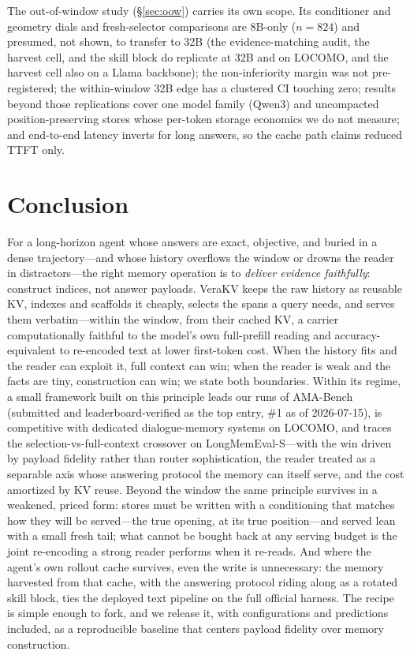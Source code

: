 \documentclass{article} %
\newcommand{\kvm}{VeraKV}
\begin{document}
The out-of-window study (\S\ref{sec:oow}) carries its own scope. Its conditioner and
geometry dials and fresh-selector comparisons are 8B-only ($n{=}824$) and presumed, not
shown, to transfer to 32B (the evidence-matching audit, the harvest cell, and the skill
block do replicate at 32B and on LOCOMO, and the harvest cell also on a Llama
backbone); the non-inferiority margin was
not pre-registered; the within-window 32B edge has a clustered CI touching zero; results
beyond those replications cover one model family (Qwen3) and uncompacted
position-preserving stores whose
per-token storage economics we do not measure; and end-to-end latency inverts for long
answers, so the cache path claims reduced TTFT only.

\section{Conclusion}
\label{sec:conclusion}

For a long-horizon agent whose answers are exact, objective, and buried in a
dense trajectory---and whose history overflows the window or drowns the reader
in distractors---the right memory operation is to \emph{deliver evidence
faithfully}: construct indices, not answer payloads. \kvm{} keeps the raw
history as reusable KV, indexes and scaffolds it cheaply, selects the spans a
query needs, and serves them verbatim---within the window, from their cached KV,
a carrier computationally faithful to the model's own full-prefill reading and
accuracy-equivalent to re-encoded text at lower first-token cost. When the
history fits and the reader can exploit
it, full context can win; when the reader is weak and the facts are tiny,
construction can win; we state both boundaries. Within its regime, a small
framework built on this principle leads our runs of AMA-Bench (submitted and
leaderboard-verified as the top entry, \#1 as of 2026-07-15), is competitive with dedicated
dialogue-memory systems on LOCOMO, and traces the selection-vs-full-context
crossover on LongMemEval-S---with the win driven by payload fidelity rather than
router sophistication, the reader treated as a separable axis whose answering
protocol the memory can itself serve, and the cost amortized by KV reuse.
Beyond the window the same principle survives in a weakened, priced form: stores must be
written with a conditioning that matches how they will be served---the true opening, at
its true position---and served lean with a small fresh tail; what cannot be bought back
at any serving budget is the joint re-encoding a strong reader performs when it re-reads.
And where the agent's own rollout cache survives, even the write is unnecessary: the
memory harvested from that cache, with the answering protocol riding along as a rotated
skill block, ties the deployed text pipeline on the full official harness.
The recipe is simple enough to fork, and we release it, with configurations and
predictions included, as a reproducible baseline that centers payload fidelity
over memory construction.
\end{document}
